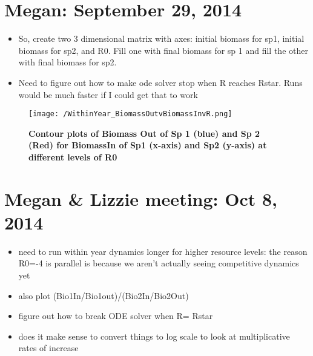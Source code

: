 \documentclass[11pt,a4paper,oneside]{article}
\begin{document}
\section{Megan: September 29, 2014}
\begin{itemize}
\item So, create two 3 dimensional matrix with axes: initial biomass for sp1, initial biomass for sp2, and R0.  Fill one with final biomass for sp 1 and fill the other with final biomass for sp2.
\item Need to figure out how to make ode solver stop when R reaches Rstar.  Runs would be much faster if I could get that to work
\end{itemize}
\begin{figure}[h!]
\centering
\noindent \texttt{[image: /WithinYear\_BiomassOutvBiomassInvR.png]}
\caption{{\bf Contour plots of Biomass Out of Sp 1 (blue) and Sp 2 (Red) for BiomassIn of Sp1 (x-axis) and Sp2 (y-axis) at different levels of R0}}
\end{figure}

\section{Megan \& Lizzie meeting: Oct 8, 2014}
\begin{itemize}
\item need to run within year dynamics longer for higher resource levels:  the reason R0=-4 is parallel is because we aren't actually seeing competitive dynamics yet
\item  also plot (Bio1In/Bio1out)/(Bio2In/Bio2Out)
\item figure out how to break ODE solver when R= Rstar
\item does it make sense to convert things to log scale to look at multiplicative rates of increase
\end{itemize}
\end{document}
